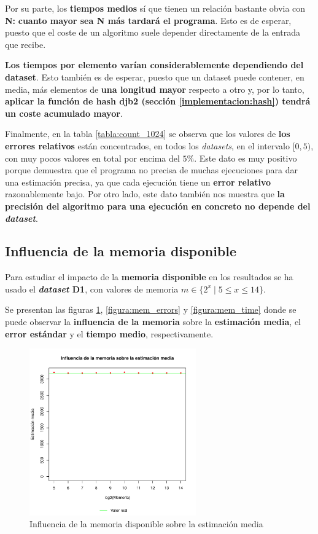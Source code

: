 Por su parte, los \textbf{tiempos medios} sí que tienen un relación bastante obvia con \textbf{N:}
\textbf{cuanto mayor sea \textbf{N} más tardará el programa}. Esto es de esperar, puesto que el coste de un algoritmo suele
depender directamente de la entrada que recibe.

\textbf{Los tiempos por elemento varían considerablemente dependiendo del dataset}. Esto también es de esperar, puesto que
un dataset puede contener, en media, más elementos de \textbf{una longitud mayor} respecto a otro y, por lo tanto,
\textbf{aplicar la función de hash djb2 (sección \ref{implementacion:hash}) tendrá un coste acumulado mayor}.

Finalmente, en la tabla \ref{tabla:count_1024} se observa que los valores de \textbf{los errores relativos} están
concentrados, en todos los \emph{datasets}, en el intervalo $[0,5)$, con muy pocos valores en total por encima del $5\%$.
Este dato es muy positivo porque demuestra que el programa no precisa de muchas ejecuciones para dar una
estimación precisa, ya que cada ejecución tiene un \textbf{error relativo} razonablemente bajo. Por otro lado, este dato también
nos muestra que \textbf{la precisión del algoritmo para una ejecución en concreto no depende del \emph{dataset}}.

\subsection{Influencia de la memoria disponible}
\label{analisis:D1_mem}

Para estudiar el impacto de la \textbf{memoria disponible} en los resultados se ha usado el \textbf{\emph{dataset} D1},
con valores de memoria $m \in \{ 2^x \: | \; 5 \leq x \leq 14 \}$.

Se presentan las figuras \ref{figura:mem_estimation}, \ref{figura:mem_errors} y \ref{figura:mem_time} donde se puede observar la
\textbf{influencia de la memoria} sobre la \textbf{estimación media}, el \textbf{error estándar} y el \textbf{tiempo medio},
respectivamente.

\begin{figure}[h!]
    \centering
        \includegraphics[width=0.64\textwidth]{../plots/D1/mem_estimation_rel.pdf}
        \caption{Influencia de la memoria disponible sobre la estimación media}
    \label{figura:mem_estimation}
\end{figure}

